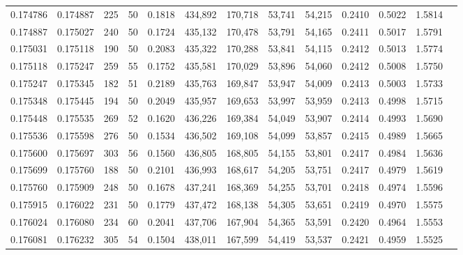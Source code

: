 \begin{tabular}{rrrrrrrrrrrrr}
0.174786 & 0.174887 &   225 &  50 &                                     0.1818 & 434,892 & 170,718 &  53,741 &  54,215 & 0.2410 & 0.5022 & 1.5814 \\
0.174887 & 0.175027 &   240 &  50 &                                     0.1724 & 435,132 & 170,478 &  53,791 &  54,165 & 0.2411 & 0.5017 & 1.5791 \\
0.175031 & 0.175118 &   190 &  50 &                                     0.2083 & 435,322 & 170,288 &  53,841 &  54,115 & 0.2412 & 0.5013 & 1.5774 \\
0.175118 & 0.175247 &   259 &  55 &                                     0.1752 & 435,581 & 170,029 &  53,896 &  54,060 & 0.2412 & 0.5008 & 1.5750 \\
0.175247 & 0.175345 &   182 &  51 &                                     0.2189 & 435,763 & 169,847 &  53,947 &  54,009 & 0.2413 & 0.5003 & 1.5733 \\
0.175348 & 0.175445 &   194 &  50 &                                     0.2049 & 435,957 & 169,653 &  53,997 &  53,959 & 0.2413 & 0.4998 & 1.5715 \\
0.175448 & 0.175535 &   269 &  52 &                                     0.1620 & 436,226 & 169,384 &  54,049 &  53,907 & 0.2414 & 0.4993 & 1.5690 \\
0.175536 & 0.175598 &   276 &  50 &                                     0.1534 & 436,502 & 169,108 &  54,099 &  53,857 & 0.2415 & 0.4989 & 1.5665 \\
0.175600 & 0.175697 &   303 &  56 &                                     0.1560 & 436,805 & 168,805 &  54,155 &  53,801 & 0.2417 & 0.4984 & 1.5636 \\
0.175699 & 0.175760 &   188 &  50 &                                     0.2101 & 436,993 & 168,617 &  54,205 &  53,751 & 0.2417 & 0.4979 & 1.5619 \\
0.175760 & 0.175909 &   248 &  50 &                                     0.1678 & 437,241 & 168,369 &  54,255 &  53,701 & 0.2418 & 0.4974 & 1.5596 \\
0.175915 & 0.176022 &   231 &  50 &                                     0.1779 & 437,472 & 168,138 &  54,305 &  53,651 & 0.2419 & 0.4970 & 1.5575 \\
0.176024 & 0.176080 &   234 &  60 &                                     0.2041 & 437,706 & 167,904 &  54,365 &  53,591 & 0.2420 & 0.4964 & 1.5553 \\
0.176081 & 0.176232 &   305 &  54 &                                     0.1504 & 438,011 & 167,599 &  54,419 &  53,537 & 0.2421 & 0.4959 & 1.5525 \\

\end{tabular}
